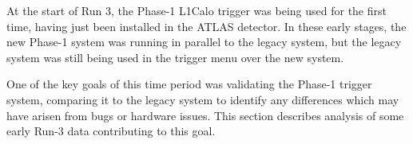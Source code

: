 


At the start of Run 3, the Phase-1 \ac{L1Calo} trigger was being used for the
first time, having just been installed in the \ac{ATLAS} detector. In these
early stages, the new Phase-1 system was running in parallel to the legacy
system, but the legacy system was still being used in the trigger menu over the
new system.

One of the key goals of this time period was validating the Phase-1 trigger
system, comparing it to the legacy system to identify any differences which may
have arisen from bugs or hardware issues. This section describes analysis of
some early Run-3 data contributing to this goal.
